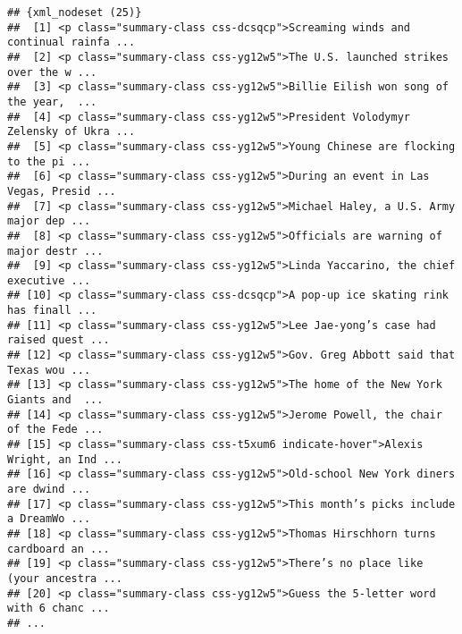 \documentclass[
]{article}
\begin{document}
\begin{verbatim}
## {xml_nodeset (25)}
##  [1] <p class="summary-class css-dcsqcp">Screaming winds and continual rainfa ...
##  [2] <p class="summary-class css-yg12w5">The U.S. launched strikes over the w ...
##  [3] <p class="summary-class css-yg12w5">Billie Eilish won song of the year,  ...
##  [4] <p class="summary-class css-yg12w5">President Volodymyr Zelensky of Ukra ...
##  [5] <p class="summary-class css-yg12w5">Young Chinese are flocking to the pi ...
##  [6] <p class="summary-class css-yg12w5">During an event in Las Vegas, Presid ...
##  [7] <p class="summary-class css-yg12w5">Michael Haley, a U.S. Army major dep ...
##  [8] <p class="summary-class css-yg12w5">Officials are warning of major destr ...
##  [9] <p class="summary-class css-yg12w5">Linda Yaccarino, the chief executive ...
## [10] <p class="summary-class css-dcsqcp">A pop-up ice skating rink has finall ...
## [11] <p class="summary-class css-yg12w5">Lee Jae-yong’s case had raised quest ...
## [12] <p class="summary-class css-yg12w5">Gov. Greg Abbott said that Texas wou ...
## [13] <p class="summary-class css-yg12w5">The home of the New York Giants and  ...
## [14] <p class="summary-class css-yg12w5">Jerome Powell, the chair of the Fede ...
## [15] <p class="summary-class css-t5xum6 indicate-hover">Alexis Wright, an Ind ...
## [16] <p class="summary-class css-yg12w5">Old-school New York diners are dwind ...
## [17] <p class="summary-class css-yg12w5">This month’s picks include a DreamWo ...
## [18] <p class="summary-class css-yg12w5">Thomas Hirschhorn turns cardboard an ...
## [19] <p class="summary-class css-yg12w5">There’s no place like (your ancestra ...
## [20] <p class="summary-class css-yg12w5">Guess the 5-letter word with 6 chanc ...
## ...
\end{verbatim}
\end{document}
